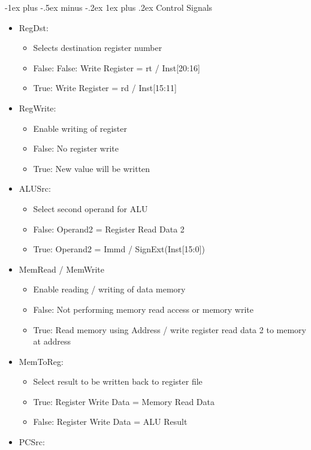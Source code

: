 \documentclass[10pt, portrait]{article}
\makeatletter
\renewcommand{\subsection}{\@startsection{subsection}{3}{0mm}%
                                {-1ex plus -.5ex minus -.2ex}%
                                {1ex plus .2ex}%
                                {\normalfont\small\bfseries}}%
\makeatother
\begin{document}
\begin{multicols*}{2}
\subsection{Control Signals}
\begin{itemize}
    \item RegDst:
    \begin{itemize}
        \item Selects destination register number
        \item False: False: Write Register = rt / Inst[20:16]
        \item True: Write Register = rd / Inst[15:11]
    \end{itemize}
    \item RegWrite:
    \begin{itemize}
        \item Enable writing of register
        \item False: No register write
        \item True: New value will be written
    \end{itemize}
    \item ALUSrc:
    \begin{itemize}
        \item Select second operand for ALU
        \item False: Operand2 = Register Read Data 2
        \item True: Operand2 = Immd / SignExt(Inst[15:0])
    \end{itemize}
    \item MemRead / MemWrite
    \begin{itemize}
        \item Enable reading / writing of data memory
        \item False: Not performing memory read access or memory write
        \item True: Read memory using Address / write register read data 2 to memory at address
    \end{itemize}
    \item MemToReg:
    \begin{itemize}
        \item Select result to be written back to register file
        \item True: Register Write Data = Memory Read Data
        \item False: Register Write Data = ALU Result
    \end{itemize}
    \item PCSrc:

\end{itemize}
\end{multicols*}
\end{document}
